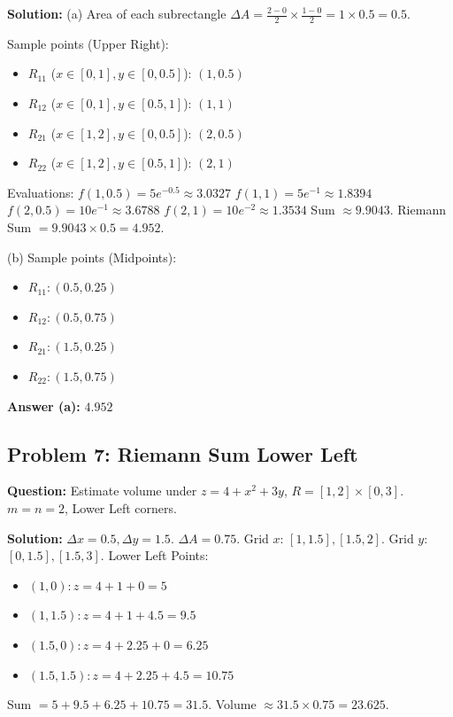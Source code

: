 \documentclass[11pt,a4paper]{article}
\begin{document}
\textbf{Solution:}
(a)
Area of each subrectangle $\Delta A = \frac{2-0}{2} \times \frac{1-0}{2} = 1 \times 0.5 = 0.5$.

Sample points (Upper Right):
\begin{itemize}
    \item $R_{11}$ ($x \in [0,1], y \in [0,0.5]$): $(1, 0.5)$
    \item $R_{12}$ ($x \in [0,1], y \in [0.5,1]$): $(1, 1)$
    \item $R_{21}$ ($x \in [1,2], y \in [0,0.5]$): $(2, 0.5)$
    \item $R_{22}$ ($x \in [1,2], y \in [0.5,1]$): $(2, 1)$
\end{itemize}

Evaluations:
$f(1, 0.5) = 5e^{-0.5} \approx 3.0327$
$f(1, 1) = 5e^{-1} \approx 1.8394$
$f(2, 0.5) = 10e^{-1} \approx 3.6788$
$f(2, 1) = 10e^{-2} \approx 1.3534$
Sum $\approx 9.9043$.
Riemann Sum $= 9.9043 \times 0.5 = 4.952$.

(b) Sample points (Midpoints):
\begin{itemize}
    \item $R_{11}: (0.5, 0.25)$
    \item $R_{12}: (0.5, 0.75)$
    \item $R_{21}: (1.5, 0.25)$
    \item $R_{22}: (1.5, 0.75)$
\end{itemize}

\textbf{Answer (a):} $4.952$

\subsection*{Problem 7: Riemann Sum Lower Left}
\textbf{Question:} Estimate volume under $z = 4+x^2+3y$, $R=[1,2] \times [0,3]$. $m=n=2$, Lower Left corners.

\textbf{Solution:}
$\Delta x = 0.5, \Delta y = 1.5$. $\Delta A = 0.75$.
Grid $x$: $[1, 1.5], [1.5, 2]$. Grid $y$: $[0, 1.5], [1.5, 3]$.
Lower Left Points:
\begin{itemize}
    \item $(1, 0): z = 4+1+0 = 5$
    \item $(1, 1.5): z = 4+1+4.5 = 9.5$
    \item $(1.5, 0): z = 4+2.25+0 = 6.25$
    \item $(1.5, 1.5): z = 4+2.25+4.5 = 10.75$
\end{itemize}
Sum $= 5 + 9.5 + 6.25 + 10.75 = 31.5$.
Volume $\approx 31.5 \times 0.75 = 23.625$.
\end{document}
